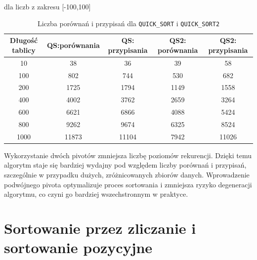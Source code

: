 \documentclass{article}
\begin{document}
	\begin{table}[h]
		\centering
		\caption{Liczba porównań i przypisań dla \texttt{QUICK\_SORT} i \texttt{QUICK\_SORT2}} dla liczb z zakresu [-100,100]
		\label{tab:qs_classic}
		\begin{tabular}{|c|c|c|c|c|}
			\hline
			\textbf{Długość tablicy} & \textbf{QS:porównania} & \textbf{QS: przypisania} & \textbf{QS2: porównania} & \textbf{QS2: przypisania} \\ \hline
			10                      & 38                          & 36                          & 39                           & 58                           \\ \hline
			100                     & 802                         & 744                         & 530                          & 682                          \\ \hline
			200                     & 1725                        & 1794                        & 1149                         & 1558                         \\ \hline
			400                     & 4002                        & 3762                        & 2659                         & 3264                         \\ \hline
			600                     & 6621                        & 6866                        & 4088                         & 5424                         \\ \hline
			800                     & 9262                        & 9674                        & 6325                         & 8524                         \\ \hline
			1000                    & 11873                       & 11104                       & 7942                         & 11026                        \\ \hline
		\end{tabular}
	\end{table}


Wykorzystanie dwóch pivotów zmniejsza liczbę poziomów rekurencji. Dzięki temu algorytm staje się bardziej wydajny pod względem liczby porównań i przypisań, szczególnie w przypadku dużych, zróżnicowanych zbiorów danych. Wprowadzenie podwójnego pivota optymalizuje proces sortowania i zmniejsza ryzyko degeneracji algorytmu, co czyni go bardziej wszechstronnym w praktyce.

\section{Sortowanie przez zliczanie i sortowanie pozycyjne}
\end{document}
